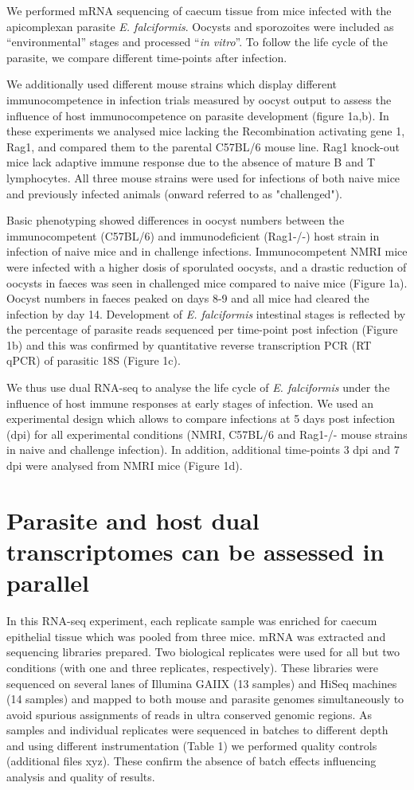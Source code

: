 \documentclass{bmcart}
\begin{document}
We performed mRNA sequencing of caecum tissue from mice infected with
the apicomplexan parasite \textit{E. falciformis}. Oocysts and
sporozoites were included as ``environmental'' stages and processed
``\textit{in vitro}''. To follow the life cycle of the parasite, we
compare different time-points after infection.

We additionally used different mouse strains which display different
immunocompetence in infection trials measured by oocyst output to assess the influence of host
immunocompetence on parasite development (figure 1a,b). In these
experiments we analysed mice lacking the Recombination activating gene 1, Rag1, and compared them to the
parental C57BL/6 mouse line. Rag1 knock-out mice lack adaptive immune
response due to the absence of mature B and T lymphocytes.  All three
mouse strains were used for infections of both naive mice and previously
infected animals (onward referred to as "challenged").

Basic phenotyping showed differences in oocyst numbers
between the immunocompetent (C57BL/6) and
immunodeficient (Rag1-/-) host strain in infection of naive mice and 
in challenge infections. Immunocompetent NMRI mice were infected with a higher dosis  
of sporulated oocysts, and a drastic reduction of oocysts in faeces was seen in challenged mice
compared to naive mice (Figure 1a). Oocyst numbers in faeces peaked on days 8-9 and 
all mice had cleared the infection by day 14. Development of \textit{E. falciformis} intestinal stages is reflected by 
the percentage of parasite reads sequenced per time-point post infection (Figure 1b) and this was confirmed by quantitative reverse transcription PCR (RT qPCR) of parasitic 18S  (Figure 1c).

We thus use dual RNA-seq to analyse the life cycle of \textit{E. falciformis} under
the influence of host immune responses at early stages of infection. We used an experimental
design which allows to compare infections at 5 days post infection (dpi) for all experimental
conditions (NMRI, C57BL/6 and Rag1-/- mouse strains in naive and challenge infection). In addition,
additional time-points 3 dpi and 7 dpi were analysed from NMRI mice (Figure 1d). 


\section*{Parasite and host dual transcriptomes can be assessed in parallel}
In this RNA-seq experiment, each replicate sample was enriched for caecum epithelial tissue which was pooled 
from three mice. mRNA was extracted and
sequencing libraries prepared. Two biological replicates were used for
all but two conditions (with one and three replicates, respectively). These libraries were sequenced on
several lanes of Illumina GAIIX (13 samples) and HiSeq machines (14 samples) and mapped to both
mouse and parasite genomes simultaneously to avoid spurious assignments
of reads in ultra conserved genomic regions. 
As samples and individual replicates were sequenced in batches to different depth and using different
instrumentation (Table 1) we performed quality controls (additional files xyz). These confirm
the absence of batch effects influencing analysis and quality of 
results. 
\end{document}
